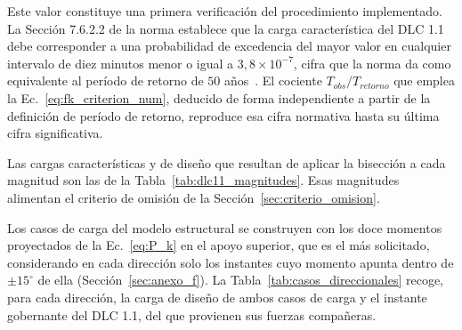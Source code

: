 Este valor constituye una primera verificación del procedimiento implementado. La Sección 7.6.2.2 de la norma establece que la carga característica del DLC 1.1 debe corresponder a una probabilidad de excedencia del mayor valor en cualquier intervalo de diez minutos menor o igual a $3{,}8 \times 10^{-7}$, cifra que la norma da como equivalente al período de retorno de $50$ años~\parencite{IEC61400-1}. El cociente $T_{obs}/T_{retorno}$ que emplea la Ec.~\ref{eq:fk_criterion_num}, deducido de forma independiente a partir de la definición de período de retorno, reproduce esa cifra normativa hasta su última cifra significativa.

Las cargas características y de diseño que resultan de aplicar la bisección a cada magnitud son las de la Tabla~\ref{tab:dlc11_magnitudes}. Esas magnitudes alimentan el criterio de omisión de la Sección~\ref{sec:criterio_omision}.

Los casos de carga del modelo estructural se construyen con los doce momentos proyectados de la Ec.~\ref{eq:P_k} en el apoyo superior, que es el más solicitado, considerando en cada dirección solo los instantes cuyo momento apunta dentro de $\pm 15^\circ$ de ella (Sección~\ref{sec:anexo_f}). La Tabla~\ref{tab:casos_direccionales} recoge, para cada dirección, la carga de diseño de ambos casos de carga y el instante gobernante del DLC 1.1, del que provienen sus fuerzas compañeras.

